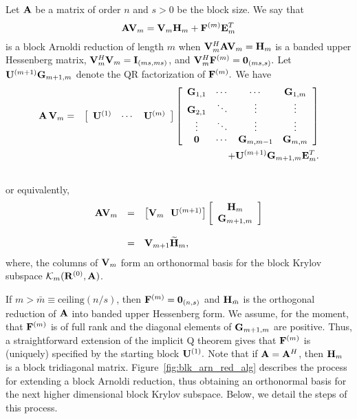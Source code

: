 \documentclass[twoside]{siamltex}
\newcommand{\bA}{{\bf A}}
\newcommand{\bE}{{\bf E}}
\newcommand{\bF}{{\bf F}}
\newcommand{\bG}{{\bf G}}
\newcommand{\bH}{{\bf H}}
\newcommand{\bV}{{\bf V}}
\newcommand{\bU}{{\bf U}}
\newcommand{\bR}{{\bf R}}
\newcommand{\dm}{\begin{displaymath}}
\newcommand{\edm}{\end{displaymath}}
\begin{document}
 Let $\bA $ be a matrix of order $n$ and $s > 0$ be the block size.
 We say that
 \begin{equation}
 \bA \bV_m = \bV_m \bH_m + \bF^{(m)} \bE^T_m \label{eq:blk_arn_red}
 \end{equation}
is a block Arnoldi reduction of length $m$ when
$\bV_m^H\bA\bV_m=\bH_m$ is a banded upper Hessenberg matrix,
$\bV_m^H\bV_m={\bf I}_{(m s,m s)}$, and $\bV_m^H\bF^{(m)}={\bf
0}_{(ms,s)}.$ Let $\bU^{(m+1)} \bG_{m+1,m}$ denote the QR
factorization of $\bF^{(m)}.$ We have
\begin{eqnarray*}
\bA \, \bV_m
     &=& \left[\begin{array}{ccc}
         \bU^{(1)} & \cdots & \bU^{(m)} \end{array}\right]
    \left[\begin{array}{cccc}
      \bG_{1,1}&\cdots& \cdots & \bG_{1,m}\\
      \bG_{2,1}&  \ddots& \vdots & \vdots \\
       \vdots & \ddots & \vdots & \vdots \\
     {\bf 0}& \cdots &  \bG_{m,m-1} & \bG_{m,m} \end{array}\right]\\
    & & + \bU^{(m+1)} \bG_{m+1,m}\bE_m^T. \\ \label{block_not} \nonumber
\end{eqnarray*}
or equivalently,
 \dm
 \begin{array}{rcl}
 \bA \bV_m &=& \left[ \bV_m ~~ \bU^{(m+1)} \right] \left[
 \begin{array}{c}
 \bH_m \\
 \bG_{m+1,m} \end{array} \right] \\ \\
 ~&=& \bV_{m+1} {\widetilde \bH}_m,
 \end{array}
 \edm
where, the columns of $\bV_m$ form an orthonormal basis for the
block Krylov subspace ${\cal K}_m ( \bR^{(0)}, \bA)$.

If $ m > \bar{m} \equiv \mbox{ceiling}(n/s)$, then $\bF^{(m)} =
{\bf 0}_{(n,s)}$ and $\bH_{\bar{m}}$ is the orthogonal reduction
of $\bA$ into banded upper Hessenberg form.  We assume, for the
moment, that $\bF^{(m)}$ is of full rank and the diagonal elements
of $\bG_{m+1,m}$ are positive. Thus, a straightforward extension
of the implicit Q theorem \cite{govl:96} gives that $\bF^{(m)}$ is
(uniquely) specified by the starting block $\bU^{(1)}.$ Note that
if $\bA = \bA^H$, then $\bH_m$ is a block tridiagonal matrix.
Figure~\ref{fig:blk_arn_red_alg} describes the process for
extending a block Arnoldi reduction, thus obtaining an orthonormal
basis for the next higher dimensional block Krylov subspace.
Below, we detail the steps of this process.
\end{document}
